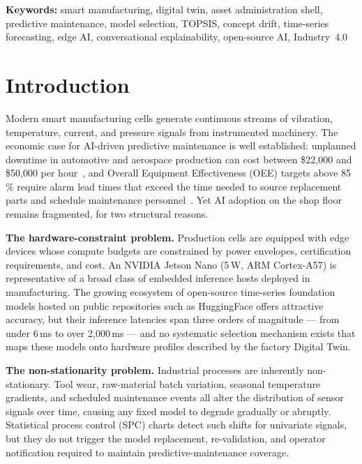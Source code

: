 \documentclass[12pt,a4paper]{article}
\begin{document}
\smallskip
\noindent\textbf{Keywords:}
smart manufacturing, digital twin, asset administration shell,
predictive maintenance, model selection, TOPSIS, concept drift,
time-series forecasting, edge AI, conversational explainability,
open-source AI, Industry~4.0

\section{Introduction}
\label{sec:intro}

Modern smart manufacturing cells generate continuous streams of
vibration, temperature, current, and pressure signals from
instrumented machinery.
The economic case for AI-driven predictive maintenance is well
established: unplanned downtime in automotive and aerospace production
can cost between \$22{,}000 and \$50{,}000 per hour~\cite{IEC62890_2020},
and Overall Equipment Effectiveness (OEE) targets above 85\,\% require
alarm lead times that exceed the time needed to source replacement parts
and schedule maintenance personnel~\cite{IDTA_AAS}.
Yet AI adoption on the shop floor remains fragmented, for two
structural reasons.

\textbf{The hardware-constraint problem.}
Production cells are equipped with edge devices whose compute budgets
are constrained by power envelopes, certification requirements, and
cost.
An NVIDIA Jetson Nano (5\,W, ARM Cortex-A57) is representative of
a broad class of embedded inference hosts deployed in manufacturing.
The growing ecosystem of open-source time-series foundation models
hosted on public repositories such as HuggingFace offers attractive
accuracy, but their inference latencies span three orders of magnitude
--- from under 6\,ms to over 2{,}000\,ms --- and no systematic
selection mechanism exists that maps these models onto hardware
profiles described by the factory Digital Twin.

\textbf{The non-stationarity problem.}
Industrial processes are inherently non-stationary.
Tool wear, raw-material batch variation, seasonal temperature gradients,
and scheduled maintenance events all alter the distribution of sensor
signals over time, causing any fixed model to degrade gradually or
abruptly.
Statistical process control (SPC) charts detect such shifts for
univariate signals, but they do not trigger the model replacement,
re-validation, and operator notification required to maintain
predictive-maintenance coverage.
\end{document}
